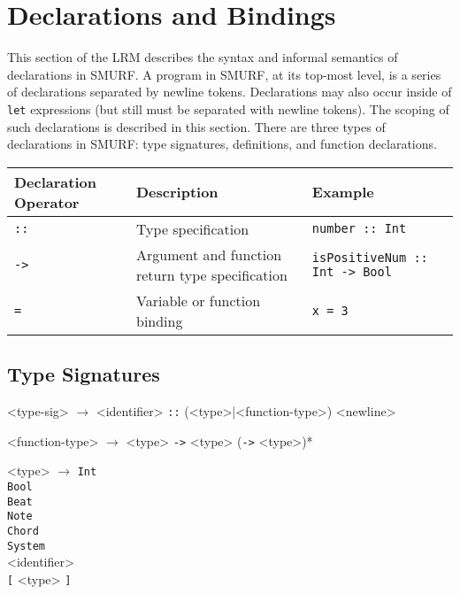 \section{Declarations and Bindings}
\label{sec:declarations}
\setlength{\grammarindent}{4em}

This section of the LRM describes the syntax and informal semantics of
declarations in SMURF. A program in SMURF, at its top-most level, is a series of declarations
separated by newline tokens.
Declarations may also occur inside of
\texttt{let} expressions (but still must be separated with newline tokens).
The scoping of such declarations is described 
in this section. There are three types of declarations in SMURF: 
type signatures, definitions, and function declarations.

\begin{table} [H]
\centering
\begin{tabularx}{\textwidth}{lXl}
\hline\hline
Declaration Operator & Description & Example \\
\hline\hline
   \texttt{::} & Type specification & \texttt{number :: Int} \\ \hline
   \texttt{->} & Argument and function return type specification
     & \texttt{isPositiveNum :: Int -> Bool}  \\ \hline
	 \texttt{=} & Variable or function binding & \texttt {x = 3} \\ \hline
\end{tabularx}
\end{table}

\subsection{Type Signatures}

\begin{grammar}

<type-sig> $\rightarrow$ <identifier> \texttt{::} (<type>|<function-type>) <newline>

<function-type> $\rightarrow$ <type> \texttt{->} <type> (\texttt{->} <type>)*

<type> $\rightarrow$ \texttt{Int} \\ \texttt{Bool} \\ \texttt{Beat} \\ \texttt{Note} \\
											\texttt{Chord} \\ \texttt{System} \\ <identifier> \\ 
											\texttt{[} <type> \texttt{]} \\ 
										

\end{grammar}


